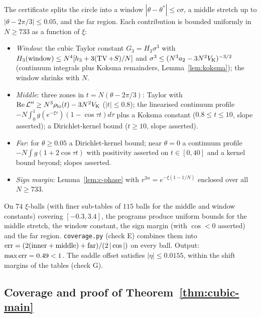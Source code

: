 The certificate splits the circle into a window $|\theta-\theta^*|\le c\sigma$, a middle stretch up to
$|\theta-2\pi/3|\le0.05$, and the far region. Each contribution is bounded uniformly in $N\ge733$ as a function of $\xi$:
\begin{itemize}
\item \emph{Window}: the cubic Taylor constant $G_3=H_3\sigma^3$ with
$H_3(\text{window})\le N^4[h_3+3(\operatorname{TV}+S)/N]$ and $\sigma^3\le(N^3a_2-3N^2V_{\rm K})^{-3/2}$ (continuum integrals plus Koksma
remainders, Lemma~\ref{lem:koksma}); the window shrinks with $N$.
\item \emph{Middle}: three zones in $t=N(\theta-2\pi/3)$: Taylor with $\operatorname{Re} \mathcal L''\ge N^3\rho_{\rm lo}(t)-3N^2V_{\rm K}$
($|t|\le0.8$); the linearised continuum profile $-N\int_0^1 g(e^{-\xi\tau})(1-\cos\tau t)d\tau$ plus a Koksma constant
($0.8\le t\le10$, slope asserted); a Dirichlet-kernel bound ($t\ge10$, slope asserted).
\item \emph{Far}: for $\theta\ge0.05$ a Dirichlet-kernel bound; near $\theta=0$ a continuum profile
$-N\int g(1+2\cos\tau t)$ with positivity asserted on $t\in[0,40]$ and a kernel bound beyond; slopes asserted.
\item \emph{Sign margin}: Lemma~\ref{lem:c-phase} with $r^{3n}=e^{-\xi(1-1/N)}$ enclosed over all $N\ge733$.
\end{itemize}

\begin{certificate}\label{cert:c-centre}
On $74$ $\xi$-balls (with finer sub-tables of $115$ balls for the middle and window constants) covering $[-0.3,3.4]$, the
programs produce uniform bounds for the middle stretch, the window constant, the sign margin (with $\cos<0$ asserted) and
the far region. \texttt{coverage.py} (check E) combines them into
${\rm err}=(2(\text{inner}+\text{middle})+\text{far})/(2\,|\cos|)$ on every ball. Output: $\max{\rm err}=0.49<1$. The
saddle offset satisfies $|\eta|\le0.0155$, within the shift margins of the tables (check G).
\end{certificate}

\subsection{Coverage and proof of Theorem~\ref{thm:cubic-main}}\label{sec:c-coverage}

